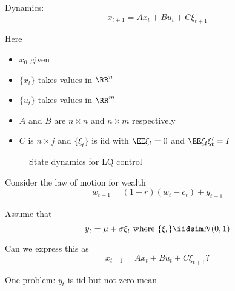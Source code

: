 \begin{frame}
    
    Dynamics:
    \begin{equation*}
        \label{eq:lq_lom}
        x_{t+1} = A x_t + B u_t + C \xi_{t+1}
    \end{equation*}

        \vspace{0.5em}
        \vspace{0.5em}
    Here

    \begin{itemize}
        \item $x_0$ given
        \vspace{0.5em}
        \item $\{x_t\}$ takes values in $\RR^n$ 
        \vspace{0.5em}
        \item $\{u_t\}$ takes values in $\RR^m$
        \vspace{0.5em}
        \item  $A$ and $B$ are $n \times n$ and $n \times m$ respectively
        \vspace{0.5em}
        \item $C$ is $n \times j$ and $\{ \xi_t \}$ is {\sc iid} with $\EE \xi_t  = 0$ and $\EE \xi_t \xi_t' = I$
    \end{itemize}


\end{frame}



\begin{frame}

    \begin{figure}
       \begin{center}
       \begin{adjustbox}{max totalsize={.95\textwidth}{.8\textheight},center}
        
       \end{adjustbox}
        \caption{\label{f:lq_dynamics} State dynamics for LQ control}
       \end{center}
    \end{figure}

\end{frame}


\begin{frame}
    
    \Eg Consider the law of motion for wealth 
    \begin{equation*}
        w_{t+1} = (1 + r) (w_t - c_t) + y_{t+1}
    \end{equation*}


    Assume that 
        $$y_t = \mu + \sigma \xi_t \text{ where } \{\xi_t\} \iidsim N(0, 1)$$

    Can we express this as
        $$ x_{t+1} = A x_t + B u_t + C \xi_{t+1} ? $$

        \vspace{0.5em}
        \vspace{0.5em}

    One problem: $y_t$ is {\sc iid} but not zero mean


\end{frame}


